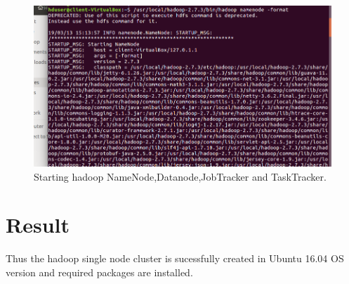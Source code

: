 \documentclass[a4paper,10pt]{article}
\begin{document}
    \begin{figure}[h]
    	\includegraphics[scale=0.30,center]{exptTwoScreenShot/fig10.png}
    	\caption{Starting hadoop NameNode,Datanode,JobTracker and TaskTracker.}
    	\label{fig:11}
    \end{figure}
    

\section{Result}
Thus the hadoop single node cluster is sucessfully created in Ubuntu 16.04 OS version and required packages are installed.
\end{document}
